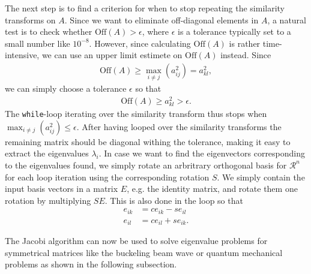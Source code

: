 \documentclass[twocolumn]{aastex62}
\begin{document}
The next step is to find a criterion for when to stop repeating the similarity transforms on $A$. Since we want to eliminate off-diagonal elements in $A$, a natural test is to check whether $\text{Off}(A) > \epsilon$, where $\epsilon$ is a tolerance typically set to a small number like $10^{-8}$. However, since calculating $\text{Off}(A)$ is rather time-intensive, we can use an upper limit estimete on $\text{Off}(A)$ instead. Since 
\begin{align}
	\text{Off}(A) \geq \max_{i\neq j}(a_{ij}^2) = a_{kl}^2,
\end{align}
we can simply choose a tolerance $\epsilon$ so that 
\begin{align}
	\text{Off}(A) \geq a_{kl}^2 > \epsilon.
\end{align}
The \texttt{while}-loop iterating over the similarity transform thus stops when $\max_{i\neq j}(a_{ij}^2) \leq \epsilon$. After having looped over the similarity transforms the remaining matrix should be diagonal withing the tolerance, making it easy to extract the eigenvalues $\lambda_i$. In case we want to find the eigenvectors corresponding to the eigenvalues found, we simply rotate an arbritrary orthogonal basis for $\mathcal{R}^n$ for each loop iteration using the corresponding rotation $S$. We simply contain the input basis vectors in a matrix $E$, e.g. the identity matrix, and rotate them one rotation by multiplying $SE$. This is also done in the loop so that 
\begin{align}
	e_{ik} &= ce_{ik} - se_{il}\\
	e_{il} &= ce_{il} + se_{ik}.
\end{align}

The Jacobi algorithm can now be used to solve eigenvalue problems for symmetrical matrices like the buckeling beam wave or quantum mechanical problems as shown in the following subsection. 
\end{document}
